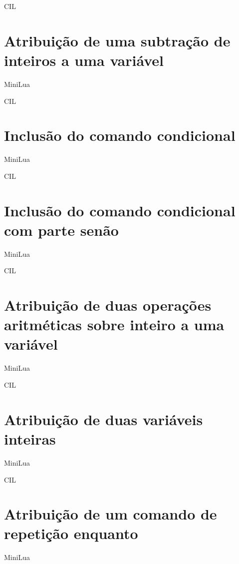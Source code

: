 \documentclass[12pt,a4paper]{report}
\begin{document}
CIL




\section{Atribuição de uma subtração de inteiros a uma variável }
 MiniLua


CIL




\section{Inclusão do comando condicional }
 MiniLua


CIL




\section{Inclusão do comando condicional com parte senão }
 MiniLua


CIL




\section{Atribuição de duas operações aritméticas sobre inteiro a uma variável }
MiniLua


CIL




\section{Atribuição de duas variáveis inteiras }
MiniLua


CIL




\section{Atribuição de um comando de repetição enquanto }
MiniLua

\end{document}
